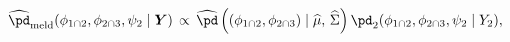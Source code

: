 \begin{equation}
\begin{gathered}
  \widehat{\pd}_{\text{meld}} (\phi_{1 \cap 2}, \phi_{2 \cap 3}, \psi_{2} \mid \boldsymbol{Y})
  \, \propto \,
  \widehat{\pd}\left((\phi_{1 \cap 2}, \phi_{2 \cap 3}) \mid \widehat{\mu}, \, \widehat{\Sigma}\right)
  \pd_{2}(\phi_{1 \cap 2}, \phi_{2 \cap 3}, \psi_{2} \mid Y_{2}),
\end{gathered}
\label{eqn:final-normal-approx}
\end{equation}